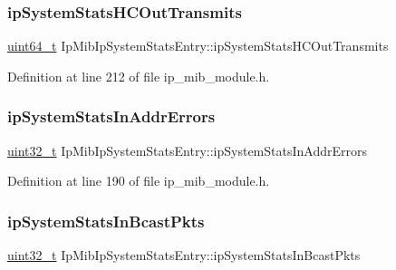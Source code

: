 \subsubsection{\texorpdfstring{ip\+System\+Stats\+H\+C\+Out\+Transmits}{ipSystemStatsHCOutTransmits}}
{\footnotesize\ttfamily \hyperlink{stdint_8h_aec6fcb673ff035718c238c8c9d544c47}{uint64\+\_\+t} Ip\+Mib\+Ip\+System\+Stats\+Entry\+::ip\+System\+Stats\+H\+C\+Out\+Transmits}



Definition at line 212 of file ip\+\_\+mib\+\_\+module.\+h.

\mbox{\label{structIpMibIpSystemStatsEntry_adde86dc6e3631e3dd3a61ed19a4c7893}} 
\subsubsection{\texorpdfstring{ip\+System\+Stats\+In\+Addr\+Errors}{ipSystemStatsInAddrErrors}}
{\footnotesize\ttfamily \hyperlink{stdint_8h_a435d1572bf3f880d55459d9805097f62}{uint32\+\_\+t} Ip\+Mib\+Ip\+System\+Stats\+Entry\+::ip\+System\+Stats\+In\+Addr\+Errors}



Definition at line 190 of file ip\+\_\+mib\+\_\+module.\+h.

\mbox{\label{structIpMibIpSystemStatsEntry_aac3f87c34af830c338a6beeb8b60f4ba}} 
\subsubsection{\texorpdfstring{ip\+System\+Stats\+In\+Bcast\+Pkts}{ipSystemStatsInBcastPkts}}
{\footnotesize\ttfamily \hyperlink{stdint_8h_a435d1572bf3f880d55459d9805097f62}{uint32\+\_\+t} Ip\+Mib\+Ip\+System\+Stats\+Entry\+::ip\+System\+Stats\+In\+Bcast\+Pkts}



